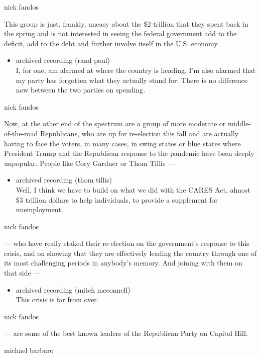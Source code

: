 nick fandos

This group is just, frankly, uneasy about the \$2 trillion that they
spent back in the spring and is not interested in seeing the federal
government add to the deficit, add to the debt and further involve
itself in the U.S. economy.

\begin{itemize}
\tightlist
\item
  archived recording (rand paul)\\
  I, for one, am alarmed at where the country is heading. I'm also
  alarmed that my party has forgotten what they actually stand for.
  There is no difference now between the two parties on spending.
\end{itemize}

nick fandos

Now, at the other end of the spectrum are a group of more moderate or
middle-of-the-road Republicans, who are up for re-election this fall and
are actually having to face the voters, in many cases, in swing states
or blue states where President Trump and the Republican response to the
pandemic have been deeply unpopular. People like Cory Gardner or Thom
Tillis ---

\begin{itemize}
\tightlist
\item
  archived recording (thom tillis)\\
  Well, I think we have to build on what we did with the CARES Act,
  almost \$3 trillion dollars to help individuals, to provide a
  supplement for unemployment.
\end{itemize}

nick fandos

--- who have really staked their re-election on the government's
response to this crisis, and on showing that they are effectively
leading the country through one of its most challenging periods in
anybody's memory. And joining with them on that side ---

\begin{itemize}
\tightlist
\item
  archived recording (mitch mcconnell)\\
  This crisis is far from over.
\end{itemize}

nick fandos

--- are some of the best known leaders of the Republican Party on
Capitol Hill.

michael barbaro

